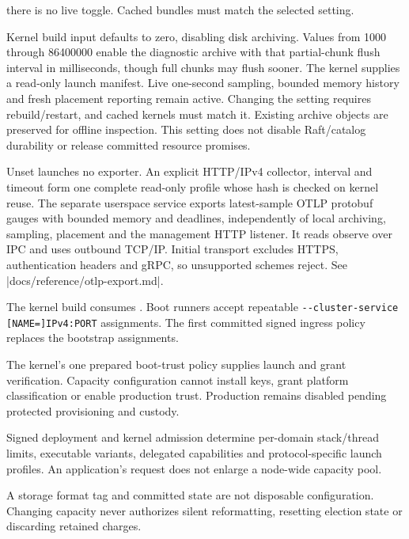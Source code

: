 \begin{description}
        there is no live toggle. Cached bundles must match the selected setting.
    \item[Diagnostic telemetry archive.] Kernel build input
         defaults to zero, disabling
        disk archiving. Values from 1000 through 86400000 enable the diagnostic
        archive with that partial-chunk flush interval in milliseconds, though full
        chunks may flush sooner. The kernel supplies a read-only launch
        manifest. Live one-second sampling, bounded memory history and fresh
        placement reporting remain active. Changing the setting requires
        rebuild/restart, and cached kernels must match it. Existing archive objects
        are preserved for offline inspection. This setting does not disable
        Raft/catalog durability or release committed resource promises.
    \item[Native telemetry export.] Unset  launches
        no exporter. An explicit HTTP/IPv4 collector, interval and timeout form
        one complete read-only profile whose hash is checked on kernel reuse.
        The separate userspace service exports latest-sample OTLP protobuf
        gauges with bounded memory and deadlines, independently of local
        archiving, sampling, placement and the management HTTP listener.
        It reads observe over IPC and uses outbound TCP/IP. Initial transport excludes
        HTTPS, authentication headers and gRPC, so unsupported schemes reject.
        See \repofile|docs/reference/otlp-export.md|.
    \item[Bootstrap assignments.] The kernel build consumes
        . Boot runners accept repeatable
        \texttt{-{}-cluster-service [NAME=]IPv4:PORT} assignments. The first
        committed signed ingress policy replaces the bootstrap assignments.
    \item[Trust policy.] The kernel's one prepared boot-trust policy supplies
        launch and grant verification. Capacity configuration cannot install
        keys, grant platform classification or enable production trust.
        Production remains disabled pending protected provisioning and custody.
    \item[Application launch policy.] Signed deployment and kernel admission
        determine per-domain stack/thread limits, executable variants,
        delegated capabilities and protocol-specific launch profiles. An
        application's request does not enlarge a node-wide capacity pool.
    \item[Persistent state.] A storage format tag and committed state are not
        disposable configuration. Changing capacity never authorizes silent
        reformatting, resetting election state or discarding retained charges.
\end{description}

